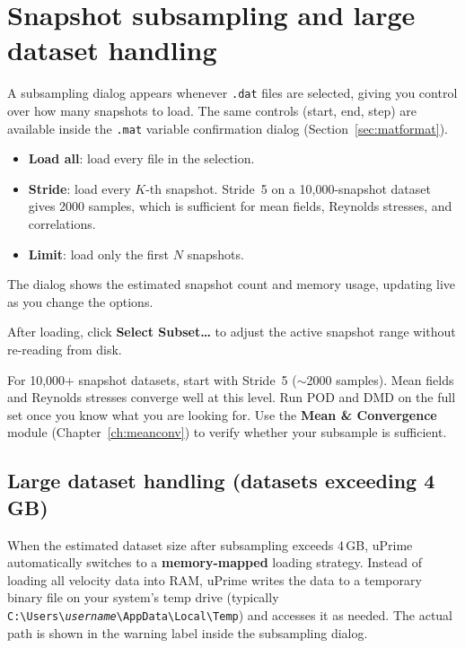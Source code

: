 \documentclass[11pt, a4paper]{report}
\newcommand{\uipth}[1]{\textbf{\textcolor{upblue}{#1}}}
\newcommand{\software}[1]{\textsf{#1}}
\begin{document}
\section{Snapshot subsampling and large dataset handling}
\label{sec:subsample}

A subsampling dialog appears whenever \texttt{.dat} files are selected, giving you control over how many snapshots to load. The same controls (start, end, step) are available inside the \texttt{.mat} variable confirmation dialog (Section~\ref{sec:matformat}).

\begin{itemize}[leftmargin=1.5em]
  \item \textbf{Load all}: load every file in the selection.
  \item \textbf{Stride}: load every $K$-th snapshot. Stride~5 on a 10,000-snapshot dataset gives 2000 samples, which is sufficient for mean fields, Reynolds stresses, and correlations.
  \item \textbf{Limit}: load only the first $N$ snapshots.
\end{itemize}

The dialog shows the estimated snapshot count and memory usage, updating live as you change the options.

After loading, click \uipth{Select Subset\ldots} to adjust the active snapshot range without re-reading from disk.

\begin{tipbox}
For 10,000+ snapshot datasets, start with Stride~5 ($\sim$2000 samples). Mean fields and Reynolds stresses converge well at this level. Run POD and DMD on the full set once you know what you are looking for. Use the \uipth{Mean \& Convergence} module (Chapter~\ref{ch:meanconv}) to verify whether your subsample is sufficient.
\end{tipbox}

\subsection{Large dataset handling (datasets exceeding 4\,GB)}

When the estimated dataset size after subsampling exceeds 4\,GB, \software{uPrime} automatically switches to a \textbf{memory-mapped} loading strategy. Instead of loading all velocity data into RAM, \software{uPrime} writes the data to a temporary binary file on your system's temp drive (typically \texttt{C:\textbackslash Users\textbackslash \textit{username}\textbackslash AppData\textbackslash Local\textbackslash Temp}) and accesses it as needed. The actual path is shown in the warning label inside the subsampling dialog.
\end{document}
